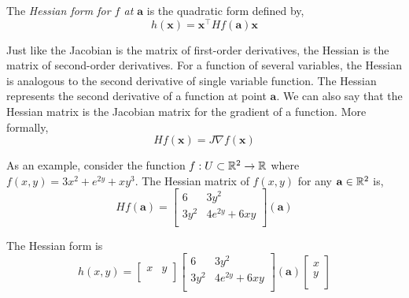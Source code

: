 \documentclass[12pt]{article}
\begin{document}
 The \emph{Hessian form for $f$ at $\mathbf{a}$} is the quadratic form defined by,
\[
h(\mathbf{x}) = \mathbf{x}^\top Hf(\mathbf{a})\mathbf{x}
\]

 Just like the Jacobian is the matrix of first-order derivatives, the Hessian is the matrix of second-order derivatives. For a function of several variables, the Hessian is analogous to the second derivative of single variable function. The Hessian represents the second derivative of a function at point $\mathbf{a}$. We can also say that the Hessian matrix is the Jacobian matrix for the gradient of a function. More formally,
\[
Hf(\mathbf{x}) = J\nabla f(\mathbf{x})
\]

 As an example, consider the function $f:U\subset\mathbb{R}^2\rightarrow\mathbb{R}$ where $f(x,y) = 3x^2 + e^{2y} +xy^3$. The Hessian matrix of $f(x,y)$ for any $\mathbf{a}\in\mathbb{R}^2$ is,
\[
Hf(\mathbf{a}) = 
\begin{bmatrix}
6 & 3y^2 \\
3y^2 & 4e^{2y}+6xy  \\
\end{bmatrix}
(\mathbf{a})
\]

 The Hessian form is 
\[
h(x,y) = 
\begin{bmatrix}
x & y \\
\end{bmatrix}
\begin{bmatrix}
6 & 3y^2 \\
3y^2 & 4e^{2y}+6xy  \\
\end{bmatrix}
(\mathbf{a})
\begin{bmatrix}
x \\
y \\
\end{bmatrix}
\]
\end{document}
